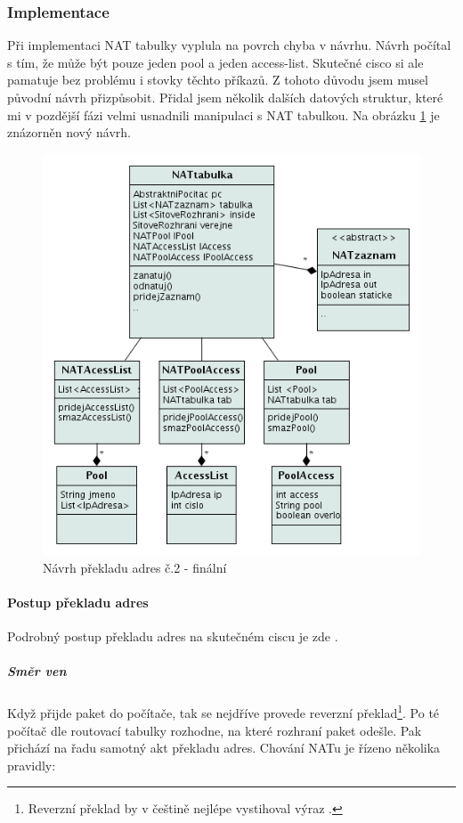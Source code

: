 \subsubsection{Implementace}
Při implementaci NAT tabulky vyplula na povrch chyba v návrhu. Návrh počítal s tím, že může být pouze jeden pool a jeden access-list. Skutečné cisco si ale pamatuje bez problému i stovky těchto příkazů. Z tohoto důvodu jsem musel původní návrh přizpůsobit. Přidal jsem několik dalších datových struktur, které mi v pozdější fázi velmi usnadnili manipulaci s NAT tabulkou. Na obrázku \ref{fig:nat_navrh2} je znázorněn nový návrh.

\begin{figure}[b]
\begin{center}
\includegraphics[width=12cm]{figures/nat_navrh2}
\caption{Návrh překladu adres č.2 - finální}
\label{fig:nat_navrh2}
\end{center}
\end{figure}

\paragraph{Postup překladu adres}
Podrobný postup překladu adres na skutečném ciscu je zde \cite{cisco:postup}.

\subparagraph{Směr ven}
Když přijde paket do počítače, tak se nejdříve provede reverzní překlad\footnote{Reverzní překlad by v češtině nejlépe vystihoval výraz .}. Po té počítač dle routovací tabulky rozhodne, na které rozhraní paket odešle. Pak přichází na řadu samotný akt překladu adres. Chování NATu je řízeno několika pravidly:

